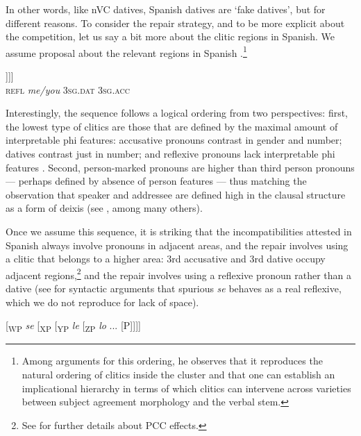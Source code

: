 \documentclass[output=paper,modfonts,nonflat,newtxmath,colorlinks,citecolor=brown]{langsci/langscibook}
\begin{document}
In other words, like nVC datives, Spanish datives are ‘fake datives’, but for different reasons. To consider the repair strategy, and to be more explicit about the competition, let us say a bit more about the clitic regions in Spanish. We assume \citet{Kayne2010} proposal about the relevant regions in Spanish .\footnote{Among \citet{Kayne2010} arguments for this ordering, he observes that it reproduces the natural ordering of clitics inside the cluster and that one can establish an implicational hierarchy in terms of which clitics can intervene across varieties between subject agreement morphology and the verbal stem.}

\ea%
    \label{ex:cabre:22}
    \gll  [\textsubscript{WP}  \textit{se}  [\textsubscript{XP}  \textit{me/te}  [\textsubscript{YP}  \textit{le}  [\textsubscript{ZP}  \textit{lo} ... [\liv P]]]] \\
    { } \textsc{refl} { } \textit{me/you} {} \textsc{3sg.dat} { } \textsc{3sg.acc}  \\
    \glt
    \z



Interestingly, the sequence follows a logical ordering from two perspectives: first, the lowest type of clitics are those that are defined by the maximal amount of interpretable phi features: accusative pronouns contrast in gender and number; datives contrast just in number; and reflexive pronouns lack interpretable phi features \citep{Reuland2011}. Second, person{}-marked pronouns are higher than third person pronouns — perhaps defined by absence of person features — thus matching the observation that speaker and addressee are defined high in the clausal structure as a form of deixis (see \citealt{Giorgi2009}, among many others).

Once we assume this sequence, it is striking that the incompatibilities attested in Spanish always involve pronouns in adjacent areas, and the repair involves using a clitic that belongs to a higher area: 3rd accusative and 3rd dative occupy adjacent regions,\footnote{See  for further details about PCC effects.} and the repair involves using a reflexive pronoun rather than a dative (see \citealt{Alcaraz2017} for syntactic arguments that spurious \textit{se} behaves as a real reflexive, which we do not reproduce for lack of space).

\ea  %
   {[}\textsubscript{WP}  \textit{se}  [\textsubscript{XP}  [\textsubscript{YP}  \textit{le}  [\textsubscript{ZP}  \textit{lo} ... [\liv P]{]]]}
\end{document}
